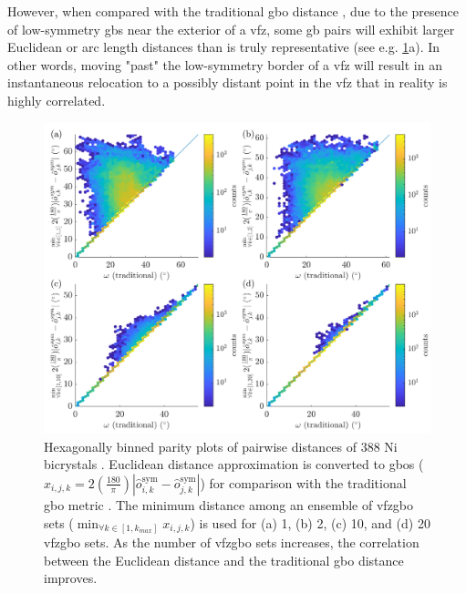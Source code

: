 \documentclass[final,twocolumn,12pt]{elsarticle}
\begin{document}
However, when compared with the traditional \gls{gbo} distance \cite{francisGeodesicOctonionMetric2019}, due to the presence of low-symmetry \glspl{gb} near the exterior of a \gls{vfz}, some \gls{gb} pairs will exhibit larger Euclidean or arc length distances than is truly representative (see e.g. \cref{fig:dist-ensemble-k1-2-10-20}a). In other words, moving "past" the low-symmetry border of a \gls{vfz} will result in an instantaneous relocation to a possibly distant point in the \gls{vfz} that in reality is highly correlated.
\begin{figure}[!ht]
    \centering
    \includegraphics[scale=1]{figures/dist-ensemble-k1-2-10-20.png}
    \caption{Hexagonally binned parity plots of pairwise distances of 388 Ni bicrystals \cite{olmstedSurveyComputedGrain2009a}. Euclidean distance approximation is converted to \glspl{gbo} ($x_{i,j,k}=2\left(\frac{180}{\pi}\right)|\hat{o}_{i,k}^{\text{sym}}-\hat{o}_{j,k}^{\text{sym}}|$) for comparison with the traditional \gls{gbo} metric \cite{chesserLearningGrainBoundary2020}. The minimum distance among an ensemble of \gls{vfzgbo} sets ($\min_{\forall k \in [1,k_{max}]}x_{i,j,k}$) is used for (a) 1, (b) 2, (c) 10, and (d) 20 \gls{vfzgbo} sets. As the number of \gls{vfzgbo} sets increases, the correlation between the Euclidean distance and the traditional \gls{gbo} distance improves.}
    \label{fig:dist-ensemble-k1-2-10-20}
\end{figure}
\end{document}
